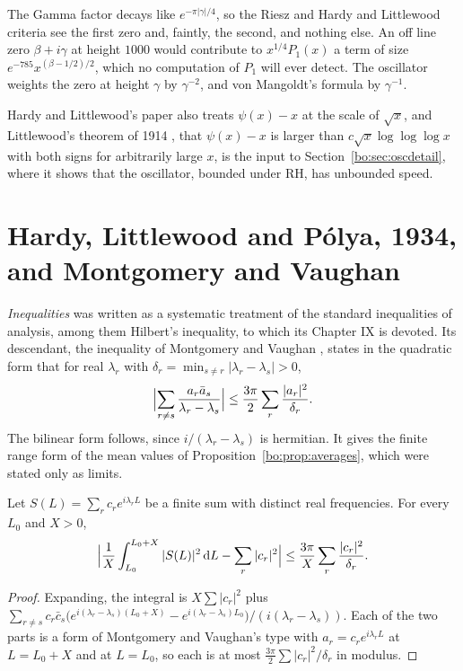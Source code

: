 The Gamma factor decays like $e^{-\pi|\gamma|/4}$, so the Riesz and Hardy and Littlewood criteria see the first zero and, faintly, the second, and nothing else. An off line zero $\beta+i\gamma$ at height $1000$ would contribute to $x^{1/4}P_1(x)$ a term of size $e^{-785}x^{(\beta-1/2)/2}$, which no computation of $P_1$ will ever detect. The oscillator weights the zero at height $\gamma$ by $\gamma^{-2}$, and von Mangoldt's formula by $\gamma^{-1}$.

Hardy and Littlewood's paper also treats $\psi(x)-x$ at the scale of $\sqrt x$, and Littlewood's theorem of 1914 \cite{Littlewood14}, that $\psi(x)-x$ is larger than $c\sqrt x\log\log\log x$ with both signs for arbitrarily large $x$, is the input to Section~\ref{bo:sec:oscdetail}, where it shows that the oscillator, bounded under RH, has unbounded speed.

\section{Hardy, Littlewood and P\'olya, 1934, and Montgomery and Vaughan}\label{cl:sec:hlp}

\emph{Inequalities} \cite{HLP34} was written as a systematic treatment of the standard inequalities of analysis, among them Hilbert's inequality, to which its Chapter IX is devoted. Its descendant, the inequality of Montgomery and Vaughan \cite{MV74}, states in the quadratic form that for real $\lambda_r$ with $\delta_r=\min_{s\ne r}|\lambda_r-\lambda_s|>0$,
\[
\Bigl|\sum_{r\ne s}\frac{a_r\bar a_s}{\lambda_r-\lambda_s}\Bigr|\le\frac{3\pi}2\sum_r\frac{|a_r|^2}{\delta_r}.
\]
The bilinear form follows, since $i/(\lambda_r-\lambda_s)$ is hermitian. It gives the finite range form of the mean values of Proposition~\ref{bo:prop:averages}, which were stated only as limits.

\begin{proposition}\label{cl:prop:window}
Let $S(L)=\sum_rc_re^{i\lambda_rL}$ be a finite sum with distinct real frequencies. For every $L_0$ and $X>0$,
\[
\Bigl|\frac1X\int_{L_0}^{L_0+X}|S(L)|^2\,\mathrm{d}L-\sum_r|c_r|^2\Bigr|\le\frac{3\pi}X\sum_r\frac{|c_r|^2}{\delta_r}.
\]
\end{proposition}

\begin{proof}
Expanding, the integral is $X\sum|c_r|^2$ plus $\sum_{r\ne s}c_r\bar c_s\bigl(e^{i(\lambda_r-\lambda_s)(L_0+X)}-e^{i(\lambda_r-\lambda_s)L_0}\bigr)/(i(\lambda_r-\lambda_s))$. Each of the two parts is a form of Montgomery and Vaughan's type with $a_r=c_re^{i\lambda_rL}$ at $L=L_0+X$ and at $L=L_0$, so each is at most $\frac{3\pi}2\sum|c_r|^2/\delta_r$ in modulus.
\end{proof}

